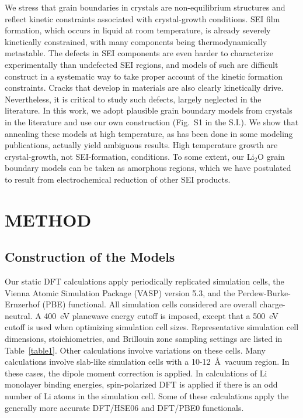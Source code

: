 \documentclass[prb,preprint,amsmath,amssymb]{revtex4}
\begin{document}
We stress that grain boundaries in crystals are non-equilibrium structures
and reflect kinetic constraints associated with crystal-growth conditions.
SEI film formation, which occurs in liquid at room temperature, is already
severely kinetically constrained, with many components being thermodynamically
metastable.\cite{batt}  The defects in SEI components are even harder to
characterize experimentally than undefected SEI regions, and models of such
are difficult construct in a systematic way to take proper account of the
kinetic formation constraints.  Cracks that develop in materials are also
clearly kinetically drive.\cite{crack} Nevertheless, it is critical to study
such defects, largely neglected in the literature.  In this work, we adopt
plausible grain boundary models from crystals in the literature\cite{shluger}
and use our own construction (Fig.~S1 in the S.I.).  We show that annealing
these models at high temperature, as has been done in some modeling
publications,\cite{dawson} actually yield ambiguous results.  High temperature
growth are crystal-growth, not SEI-formation, conditions.  To some extent, our
Li$_2$O grain boundary models can be taken as amorphous regions, which we
have postulated to result from electrochemical reduction of other SEI
products.\cite{batt} 

\section*{METHOD}

\subsection*{Construction of the Models}

Our static DFT calculations apply periodically replicated simulation cells,
the Vienna Atomic Simulation Package (VASP) version
5.3,\cite{vasp1,vasp1a,vasp2,vasp3} and the Perdew-Burke-Ernzerhof (PBE)
functional.\cite{pbe}  All simulation cells considered are overall
charge-neutral.  A 400~eV planewave energy cutoff is imposed, except
that a 500~eV cutoff is used when optimizing simulation cell sizes.
Representative simulation cell dimensions, stoichiometries, and Brillouin
zone sampling settings are listed in Table~\ref{table1}.  Other calculations
involve variations on these cells.  Many calculations
involve slab-like simulation cells with a 10-12~\AA\, vacuum region.  In
these cases, the dipole moment correction is applied.\cite{dipole}
In calculations of Li monolayer binding energies, spin-polarized DFT is
applied if there is an odd number of Li atoms in the simulation cell.
Some of these calculations apply the generally more accurate
DFT/HSE06 and DFT/PBE0 functionals.\cite{hse06a,hse06b,hse06c,pbe0}
\end{document}
